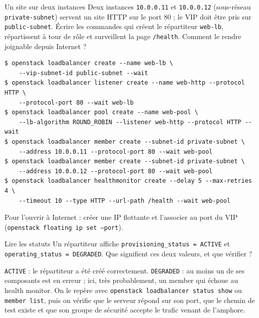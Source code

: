 \begin{exercice}{Un site sur deux instances}\label{ex:oc-site}
Deux instances \texttt{10.0.0.11} et \texttt{10.0.0.12} (sous-réseau \texttt{private-subnet}) servent un site HTTP sur le
port 80 ; le VIP doit être pris sur \texttt{public-subnet}. Écrire les commandes qui créent le répartiteur \texttt{web-lb},
répartissent à tour de rôle et surveillent la page \texttt{/health}. Comment le rendre joignable depuis Internet ?
\end{exercice}
\begin{correction}
\begin{lstlisting}[style=terminal]
$ openstack loadbalancer create --name web-lb \
    --vip-subnet-id public-subnet --wait
$ openstack loadbalancer listener create --name web-http --protocol HTTP \
    --protocol-port 80 --wait web-lb
$ openstack loadbalancer pool create --name web-pool \
    --lb-algorithm ROUND_ROBIN --listener web-http --protocol HTTP --wait
$ openstack loadbalancer member create --subnet-id private-subnet \
    --address 10.0.0.11 --protocol-port 80 --wait web-pool
$ openstack loadbalancer member create --subnet-id private-subnet \
    --address 10.0.0.12 --protocol-port 80 --wait web-pool
$ openstack loadbalancer healthmonitor create --delay 5 --max-retries 4 \
    --timeout 10 --type HTTP --url-path /health --wait web-pool
\end{lstlisting}
Pour l'ouvrir à Internet : créer une IP flottante et l'associer au port du VIP (\texttt{openstack floating ip set --port}).
\end{correction}

\begin{exercice}{Lire les statuts}\label{ex:oc-statuts}
Un répartiteur affiche \texttt{provisioning\_status = ACTIVE} et \texttt{operating\_status = DEGRADED}. Que signifient ces
deux valeurs, et que vérifier ?
\end{exercice}
\begin{correction}
\texttt{ACTIVE} : le répartiteur a été créé correctement. \texttt{DEGRADED} : au moins un de ses composants est en erreur ;
ici, très probablement, un member qui échoue au health monitor. On le repère avec
\texttt{openstack loadbalancer status show} ou \texttt{member list}, puis on vérifie que le serveur répond sur son port, que
le chemin de test existe et que son groupe de sécurité accepte le trafic venant de l'amphore.
\end{correction}

